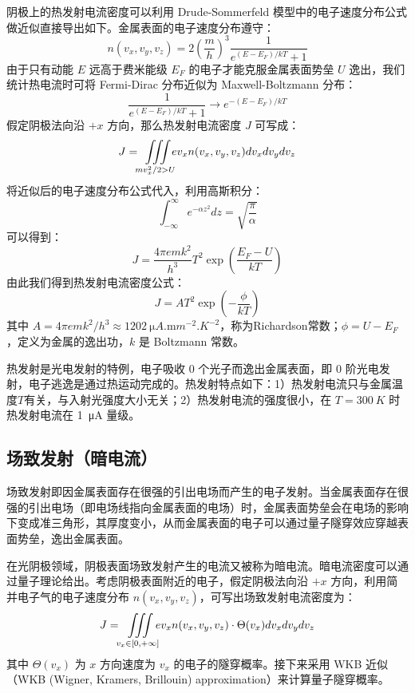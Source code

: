 阴极上的热发射电流密度可以利用 Drude-Sommerfeld 模型中的电子速度分布公式做近似直接导出如下。金属表面的电子速度分布遵守：
	\[n(v_x, v_y, v_z) = 2\left(\frac{m}{h}\right)^3\frac{1}{e^{(E-E_F)/kT}+1}\]
	由于只有动能 $E$ 远高于费米能级 $E_F$ 的电子才能克服金属表面势垒 $U$ 逸出，我们统计热电流时可将 Fermi-Dirac 分布近似为 Maxwell-Boltzmann 分布：
	\[\frac{1}{e^{(E-E_F)/kT}+1} \rightarrow e^{-(E-E_F)/kT}\]
	假定阴极法向沿 $+x$ 方向，那么热发射电流密度 $J$ 可写成：
	\[J = \iiint\limits_{mv_x^2/2 > U}\!\!\! ev_xn(v_x, v_y, v_z)dv_xdv_ydv_z\]
	将近似后的电子速度分布公式代入，利用高斯积分：
	\[\int_{-\infty}^{\infty}e^{-\alpha z^2}dz=\sqrt{\frac{\pi}{\alpha}}\]
	可以得到：
	\[J = \frac{4\pi emk^2}{h^3}T^2\exp\left(\frac{E_F-U}{kT}\right)\]
	由此我们得到热发射电流密度公式：
\begin{equation}
	J = AT^2\exp\left(-\frac{\phi}{kT}\right)
\end{equation}
	其中 $A=4\pi emk^2/h^3\approx \SI{1202}{\micro A.\milli m^{-2}.K^{-2}}$，称为Richardson常数；$\phi=U-E_F$，定义为金属的逸出功，$k$ 是 Boltzmann 常数。

热发射是光电发射的特例，电子吸收 0 个光子而逸出金属表面，即 0 阶光电发射，电子逃逸是通过热运动完成的。热发射特点如下：1）热发射电流只与金属温度$T$有关，与入射光强度大小无关；2）热发射电流的强度很小，在 $T = \SI{300}{K}$ 时热发射电流在 \SI{1}{\micro A} 量级。

\subsection{场致发射（暗电流）}
场致发射即因金属表面存在很强的引出电场而产生的电子发射。当金属表面存在很强的引出电场（即电场线指向金属表面的电场）时，金属表面势垒会在电场的影响下变成准三角形，其厚度变小，从而金属表面的电子可以通过量子隧穿效应穿越表面势垒，逸出金属表面。

在光阴极领域，阴极表面场致发射产生的电流又被称为暗电流。暗电流密度可以通过量子理论给出。考虑阴极表面附近的电子，假定阴极法向沿 $+x$ 方向，利用简并电子气的电子速度分布 $n(v_x, v_y, v_z)$，可写出场致发射电流密度为：
	\[
	J = \iiint\limits_{v_x \in [0, +\infty]}\!\!\! ev_xn(v_x, v_y, v_z)\cdot \Theta(v_x)dv_xdv_ydv_z
	\]
	其中 $\Theta(v_x)$ 为 $x$ 方向速度为 $v_x$ 的电子的隧穿概率。接下来采用 WKB 近似（WKB (Wigner, Kramers, Brillouin) approximation）来计算量子隧穿概率。

